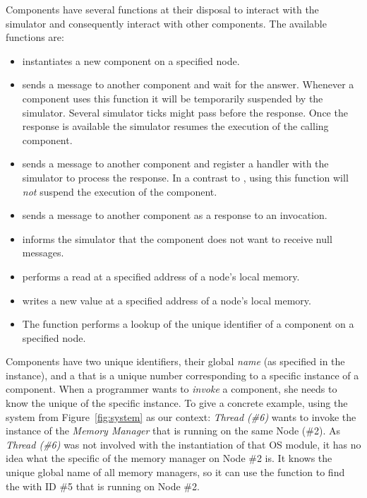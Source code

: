Components have several functions at their disposal to interact with the simulator and consequently interact with other components.
The available functions are:
\begin{itemize}
\item {}
instantiates a new component on a specified node.
\item {}
sends a message to another component and wait for the answer.
Whenever a component uses this function it will be temporarily suspended by the simulator.
Several simulator ticks might pass before the response.
Once the response is available the simulator resumes the execution of the calling component.
\item {}
sends a message to another component and register a handler with the simulator to process the response.
In a contrast to , using this function will \emph{not} suspend the execution of the component.
\item {}
sends a message to another component as a response to an invocation.
\item {}
informs the simulator that the component does not want to receive null messages.
\item {}
performs a read at a specified address of a node's local memory.
\item {}
writes a new value at a specified address of a node's local memory.
\item The function {}
performs a lookup of the unique identifier of a component on a specified node.
\end{itemize}
Components have two unique identifiers, their global \emph{name} (as specified in the  instance), and a  that is a unique number corresponding to a specific instance of a component.
When a programmer wants to \emph{invoke} a component, she needs to know the unique \mbox{} of the specific instance.
To give a concrete example, using the system from Figure~\ref{fig:system} as our context: \emph{Thread (\#6)} wants to invoke the instance of the \emph{Memory Manager} that is running on the same Node (\#2).
As \emph{Thread (\#6)} was not involved with the instantiation of that OS module, it has no idea what the specific  of the memory manager on Node \#2 is.
It knows the unique global name of all memory managers, so it can use the  function to find the  with ID \#5 that is running on Node \#2.


